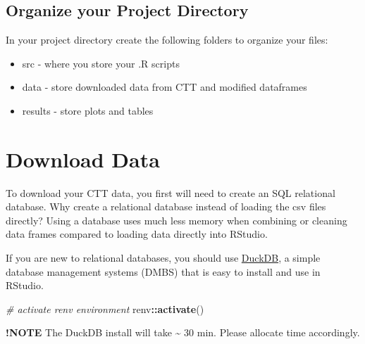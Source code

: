 \documentclass[
]{book}
\newenvironment{Shaded}{\begin{snugshade}}{\end{snugshade}}
\newcommand{\CommentTok}[1]{\textcolor[rgb]{0.56,0.35,0.01}{\textit{#1}}}
\newcommand{\FunctionTok}[1]{\textcolor[rgb]{0.13,0.29,0.53}{\textbf{#1}}}
\newcommand{\NormalTok}[1]{#1}
\newcommand{\SpecialCharTok}[1]{\textcolor[rgb]{0.81,0.36,0.00}{\textbf{#1}}}
\providecommand{\tightlist}{%
  \setlength{\itemsep}{0pt}\setlength{\parskip}{0pt}}
\begin{document}
\section{Organize your Project Directory}\label{organize-your-project-directory}

In your project directory create the following folders to organize your files:

\begin{itemize}
\tightlist
\item
  src - where you store your .R scripts
\item
  data - store downloaded data from CTT and modified dataframes
\item
  results - store plots and tables
\end{itemize}

\chapter{Download Data}\label{download-data}

To download your CTT data, you first will need to create an SQL relational database. Why create a relational database instead of loading the csv files directly? Using a database uses much less memory when combining or cleaning data frames compared to loading data directly into RStudio.

If you are new to relational databases, you should use \href{https://duckdb.org/why_duckdb}{DuckDB}, a simple database management systems (DMBS) that is easy to install and use in RStudio.

\begin{Shaded}
\begin{Highlighting}[]
\CommentTok{\# activate renv environment}
\NormalTok{renv}\SpecialCharTok{::}\FunctionTok{activate}\NormalTok{()}
\end{Highlighting}
\end{Shaded}

\textbf{!NOTE} The DuckDB install will take \textasciitilde{} 30 min. Please allocate time accordingly.
\end{document}
